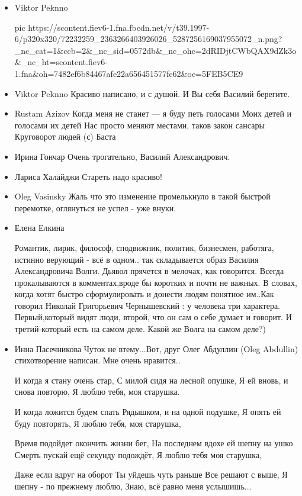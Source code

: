 \begin{itemize}

\item Viktor Peknno

\ifcmt
pic https://scontent.fiev6-1.fna.fbcdn.net/v/t39.1997-6/p320x320/72232259_2363266403926026_5287256169037955072_n.png?_nc_cat=1&ccb=2&_nc_sid=0572db&_nc_ohc=2dRIDjtCWbQAX9dZk3o&_nc_ht=scontent.fiev6-1.fna&oh=7482ef6b84467afe22a656451577fe62&oe=5FEB5CE9
\fi

\item Viktor Peknno
Красиво написано, и с душой. И Вы себя Василий берегите.

\item Rustam Azizov
Когда меня не станет --- я буду петь голосами
Моих детей и голосами их детей
Нас просто меняют местами, таков закон сансары
Круговорот людей (с) Баста

\item Ирина Гончар
Очень трогательно, Василий Александрович.

\item Лариса Халайджи
Стареть надо красиво!

\item Oleg Vasinsky
Жаль что это изменение промелькнуло в такой быстрой перемотке, оглянуться не успел - уже внуки.

\item Елена Елкина

Романтик, лирик, философ, сподвижник, политик, бизнесмен, работяга, истинно
верующий - всё в одном.. так складывается образ Василия Александровича Волги.
Дьявол прячется в мелочах, как говорится. Всегда прокалываются в
комментах,вроде бы коротких и почти не важных. В словах, когда хотят быстро
сформулировать и донести людям понятное им..Как говорил Николай Григорьевич
Чернышевский : у человека три характера. Первый,который видят люди, второй, что
он сам о себе думает и говорит. И третий-который есть на самом деле. Какой же
Волга на самом деле?)

\item Инна Пасечникова
Чуток не втему...Вот, друг Олег Абдуллин (Oleg Abdullin)
стихотворение написан. Мне очень нравится..

\begin{multicols}{2}
	\obeycr
И когда я стану очень стар,
С милой сидя на лесной опушке,
Я ей вновь, и снова повторю,
Я люблю тебя, моя старушка.

И когда ложится будем спать
Рядышком, и на одной подушке,
Я опять ей буду повторять,
Я люблю тебя, моя старушка,

Время подойдет окончить жизни бег,
На последнем вдохе ей шепну на ушко
Смерть пускай ещё секунду подождёт,
Я люблю тебя моя старушка,

Даже если вдруг на оборот
Ты уйдешь чуть раньше
Все решают с выше,
Я шепну - по прежнему люблю,
Знаю, всё равно меня услышишь... 
	\restorecr
\end{multicols}

\end{itemize}
